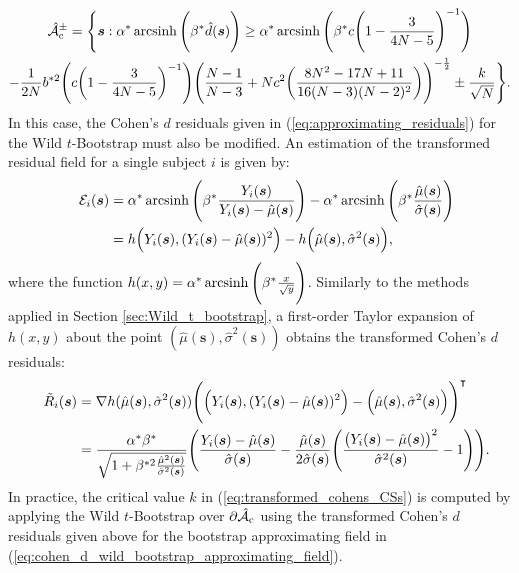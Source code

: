 \begin{multline}
\label{eq:transformed_cohens_CSs}
    \operatorname{\hat{\mathcal{A}}_{c}^\pm} = \Bigg\{\bm{s} : \alpha^{*} \operatorname{arcsinh}\Bigg(\beta^{*} \hat{d}(\bm{s}) \Bigg) \geq \alpha^{*} \operatorname{arcsinh}\Bigg(\beta^{*} c \Bigg(1 - \frac{3}{4N -5}\Bigg)^{-1} \Bigg) \\
    - \frac{1}{2N}b^{*2}\Bigg(c \bigg(1 - \frac{3}{4N - 5}\bigg)^{-1} \Bigg)\Bigg(\frac{N-1}{N-3} + N c^{2} \bigg(\frac{8N^{2} - 17N + 11}{16(N-3)(N-2)^{2}} \bigg)\Bigg)^{-\frac{1}{2}} \pm \frac{k}{\sqrt{N}} \Bigg\}. 
\end{multline}
In this case, the Cohen's $d$ residuals given in (\ref{eq:approximating_residuals}) for the Wild $t$-Bootstrap must also be modified. An estimation of the transformed residual field for a single subject $i$ is given by: 
\begin{alignat}{4}
\label{eq:single_subject_transformed_residuals}
&&\mathcal{E}_{i}(\bm{s})
& = \alpha^{*} \operatorname{arcsinh}\Bigg(\beta^{*} \frac{Y_{i}(\bm{s})}{Y_{i}(\bm{s}) - \hat{\mu}(\bm{s})} \Bigg) - \alpha^{*} \operatorname{arcsinh}\Bigg(\beta^{*} \frac{\hat{\mu}(\bm{s})}{\hat{\sigma}(\bm{s})} \Bigg)\notag\\
&
&
&= h\Big(Y_{i}(\bm{s}),(Y_{i}(\bm{s}) - \hat{\mu}(\bm{s}))^{2}\Big) - h\Big(\hat{\mu}(\bm{s}), \hat{\sigma}^{2}(\bm{s})\Big),
\end{alignat}
where the function $h(x,y) =  \alpha^{*} \operatorname{arcsinh}\Bigg(\beta^{*} \frac{x}{\sqrt{y}}\Bigg)$. Similarly to the methods applied in Section \ref{sec:Wild_t_bootstrap}, a first-order Taylor expansion of $h(x,y)$ about the point $(\hat{\mu}(\bm{s}), \hat{\sigma}^{2}(\bm{s}))$ obtains the transformed Cohen's $d$ residuals:
\begin{alignat}{4}
\label{eq:transformed_approximating_residuals}
&&\tilde{R}_{i}(\bm{s})
&= \nabla h(\hat{\mu}(\bm{s}),\hat{\sigma}^{2}(\bm{s}))\Bigg( \Big(Y_{i}(\bm{s}),(Y_{i}(\bm{s}) - \hat{\mu}(\bm{s}))^{2}\Big) - \Big(\hat{\mu}(\bm{s}), \hat{\sigma}^{2}(\bm{s}) \Big) \Bigg)^{\intercal}\notag\\
&
&
&= \frac{\alpha^{*}\beta^{*}}{\sqrt{1 + \beta^{*2}\frac{\hat{\mu}^{2}(\bm{s})}{\hat{\sigma}^{2}(\bm{s})}}} \Bigg(\frac{Y_{i}(\bm{s}) - \hat{\mu}(\bm{s})}{\hat{\sigma}(\bm{s})} - \frac{\hat{\mu}(\bm{s})}{2\hat{\sigma}(\bm{s})}\Bigg( \frac{\big(Y_{i}(\bm{s}) - \hat{\mu}(\bm{s})\big)^{2}}{\hat{\sigma}^{2}(\bm{s})} - 1 \Bigg)\Bigg).
\end{alignat}
In practice, the critical value $k$ in (\ref{eq:transformed_cohens_CSs}) is computed by applying the Wild $t$-Bootstrap over $\operatorname{\partial\hat{\mathcal{A}}_{c}}$ using the transformed Cohen's $d$ residuals given above for the bootstrap approximating field in (\ref{eq:cohen_d_wild_bootstrap_approximating_field}).

